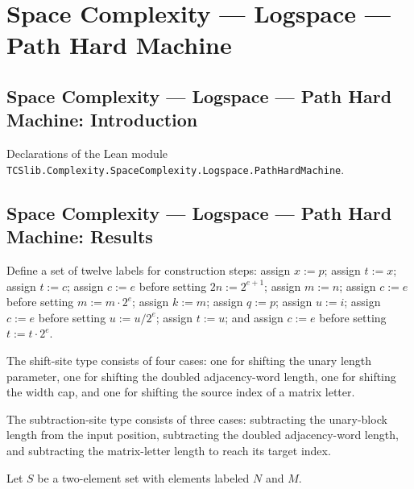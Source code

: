 \section{Space Complexity --- Logspace --- Path Hard Machine}
\subsection*{Space Complexity --- Logspace --- Path Hard Machine: Introduction}

Declarations of the Lean module \texttt{TCSlib.Complexity.SpaceComplexity.Logspace.PathHardMachine}.

\subsection*{Space Complexity --- Logspace --- Path Hard Machine: Results}

\begin{definition}
\label{Complexity.PathHard.CpS}
\leanok
Define a set of twelve labels for construction steps: assign $x:=p$; assign $t:=x$;
assign $t:=c$; assign $c:=e$ before setting $2n:=2^{e+1}$; assign $m:=n$; assign $c:=e$
before setting $m:=m\cdot2^e$; assign $k:=m$; assign $q:=p$; assign $u:=i$; assign
$c:=e$ before setting $u:=u/2^e$; assign $t:=u$; and assign $c:=e$ before setting
$t:=t\cdot2^e$.
\end{definition}

\begin{definition}
\label{Complexity.PathHard.ShS}
\leanok
The shift-site type consists of four cases: one for shifting the unary length parameter,
one for shifting the doubled adjacency-word length, one for shifting the width cap, and
one for shifting the source index of a matrix letter.
\end{definition}

\begin{definition}
\label{Complexity.PathHard.SbS}
\leanok
The subtraction-site type consists of three cases: subtracting the unary-block length
from the input position, subtracting the doubled adjacency-word length, and subtracting
the matrix-letter length to reach its target index.
\end{definition}

\begin{definition}
\label{Complexity.PathHard.LeS}
\leanok
Let $S$ be a two-element set with elements labeled $N$ and $M$.
\end{definition}

